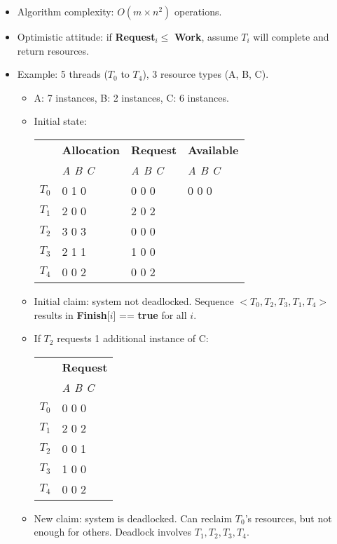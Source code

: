 \begin{itemize}
\begin{enumerate}
    \end{enumerate}
    \item Algorithm complexity: $O(m \times n^2)$ operations.
    \item Optimistic attitude: if \textbf{Request}$_i \leq$ \textbf{Work}, assume $T_i$ will complete and return resources.
    \item Example: 5 threads ($T_0$ to $T_4$), 3 resource types (A, B, C).
    \begin{itemize}
        \item A: 7 instances, B: 2 instances, C: 6 instances.
        \item Initial state:
        \begin{tabular}{p{}p{}p{}p{}}
            \toprule
            & \textbf{Allocation} & \textbf{Request} & \textbf{Available} \\
            & \textit{A B C} & \textit{A B C} & \textit{A B C} \\
            \midrule
            $T_0$ & 0 1 0 & 0 0 0 & 0 0 0 \\
            $T_1$ & 2 0 0 & 2 0 2 & \\
            $T_2$ & 3 0 3 & 0 0 0 & \\
            $T_3$ & 2 1 1 & 1 0 0 & \\
            $T_4$ & 0 0 2 & 0 0 2 & \\
            \bottomrule
        \end{tabular}
        \item Initial claim: system not deadlocked. Sequence $<T_0, T_2, T_3, T_1, T_4>$ results in \textbf{Finish}[$i$] == \textbf{true} for all $i$.
        \item If $T_2$ requests 1 additional instance of C:
        \begin{tabular}{p{}p{}}
            \toprule
            & \textbf{Request} \\
            & \textit{A B C} \\
            \midrule
            $T_0$ & 0 0 0 \\
            $T_1$ & 2 0 2 \\
            $T_2$ & 0 0 1 \\
            $T_3$ & 1 0 0 \\
            $T_4$ & 0 0 2 \\
            \bottomrule
        \end{tabular}
        \item New claim: system is deadlocked. Can reclaim $T_0$'s resources, but not enough for others. Deadlock involves $T_1, T_2, T_3, T_4$.
    \end{itemize}
\end{itemize}

